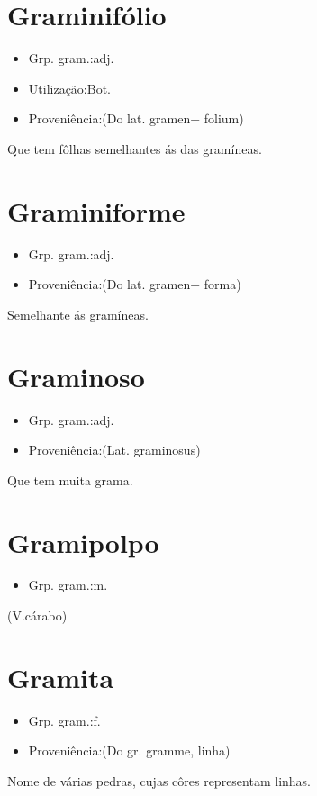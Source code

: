 \section{Graminifólio}
\begin{itemize}
\item {Grp. gram.:adj.}
\end{itemize}
\begin{itemize}
\item {Utilização:Bot.}
\end{itemize}
\begin{itemize}
\item {Proveniência:(Do lat. \textunderscore gramen\textunderscore  + \textunderscore folium\textunderscore )}
\end{itemize}
Que tem fôlhas semelhantes ás das gramíneas.
\section{Graminiforme}
\begin{itemize}
\item {Grp. gram.:adj.}
\end{itemize}
\begin{itemize}
\item {Proveniência:(Do lat. \textunderscore gramen\textunderscore  + \textunderscore forma\textunderscore )}
\end{itemize}
Semelhante ás gramíneas.
\section{Graminoso}
\begin{itemize}
\item {Grp. gram.:adj.}
\end{itemize}
\begin{itemize}
\item {Proveniência:(Lat. \textunderscore graminosus\textunderscore )}
\end{itemize}
Que tem muita grama.
\section{Gramipolpo}
\begin{itemize}
\item {Grp. gram.:m.}
\end{itemize}
(V.cárabo)
\section{Gramita}
\begin{itemize}
\item {Grp. gram.:f.}
\end{itemize}
\begin{itemize}
\item {Proveniência:(Do gr. \textunderscore gramme\textunderscore , linha)}
\end{itemize}
Nome de várias pedras, cujas côres representam linhas.
